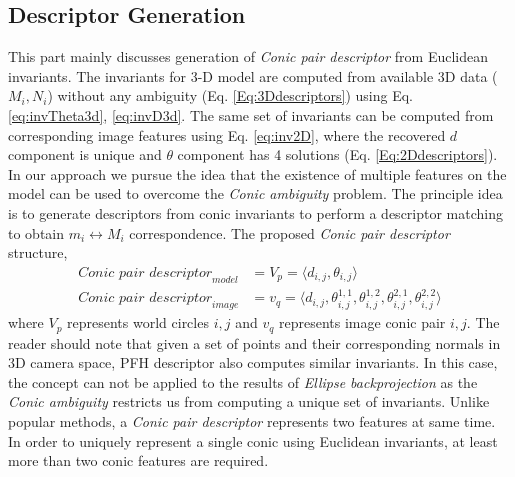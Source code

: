 \documentclass{bmvc2k}
\begin{document}
\subsection{Descriptor Generation}\label{ssec:descriptor}
This part mainly discusses generation of \textit{Conic pair descriptor} from Euclidean invariants. 
The invariants for 3-D model are computed from available 3D data ($M_i,N_i$) without any ambiguity (Eq. \ref{Eq:3Ddescriptors}) using Eq. \ref{eq:invTheta3d}, \ref{eq:invD3d}. 
The same set of invariants can be computed from corresponding image features using Eq. \ref{eq:inv2D}, where the recovered $ d $ component is unique and $ \theta $ component has 4 solutions (Eq. \ref{Eq:2Ddescriptors}). 
In our approach we pursue the idea that the existence of multiple features on the model can be used to overcome the \textit{Conic ambiguity} problem. 
The principle idea is to generate descriptors from conic invariants to perform a descriptor matching to obtain $ m_i \leftrightarrow M_i $ correspondence.
The proposed \textit{Conic pair descriptor} structure,
\begin{align}
\textit{Conic pair descriptor}_{model} &= V_{p} = \langle d_{i,j},\theta_{i,j} \rangle \label{Eq:3Ddescriptors} \\
\textit{Conic pair descriptor}_{image} &= v_{q} = 
			\langle  d_{i,j},\theta_{i,j}^{1,1},\theta_{i,j}^{1,2},\theta_{i,j}^{2,1},\theta_{i,j}^{2,2} \rangle \label{Eq:2Ddescriptors} 
\end{align}
where $V_{p}$ represents world circles $i,j$ and $v_{q}$ represents image conic pair $i,j$. 
The reader should note that given a set of points and their corresponding normals in 3D camera space, PFH descriptor \cite{RusuDoctoralDissertation} also computes similar invariants. In this case, the concept can not be applied to the results of \textit{Ellipse backprojection} as the \textit{Conic ambiguity} restricts us from computing a unique set of invariants. 
Unlike popular methods, a \textit{Conic pair descriptor} represents two features at same time. 
In order to uniquely represent a single conic using Euclidean invariants, at least more than two conic features are required. 
\end{document}
